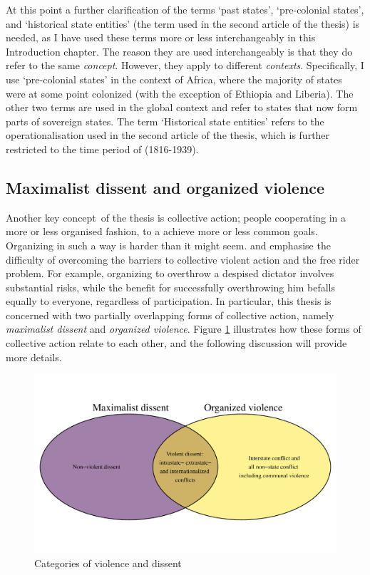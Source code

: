 At this point a further clarification of the terms `past states', `pre-colonial
states', and `historical state entities' (the term used in the second article of
the thesis) is needed, as I have used these terms more or less interchangeably
in this Introduction chapter. The reason they are used interchangeably is that
they do refer to the same \textit{concept}. However, they apply to different
\textit{contexts}. Specifically, I use `pre-colonial states' in the context of
Africa, where the majority of states were at some point colonized (with the
exception of Ethiopia and Liberia). The other two terms are used in the global
context and refer to states that now form parts of sovereign states. The term
`Historical state entities' refers to the operationalisation used in the second
article of the thesis, which is further restricted to the time period of
(1816-1939).

\subsection{Maximalist dissent and organized violence}
\label{Maximalist dissent and organized violence}

Another key concept of the thesis is collective action; people cooperating in a
more or less organised fashion, to a achieve more or less common goals.
Organizing in such a way is harder than it might seem.
\citet{OlsonMancur1965TLoC} and \citet{Tullock_1971} emphasise the difficulty of
overcoming the barriers to collective violent action and the free rider problem.
For example, organizing to overthrow a despised dictator involves substantial
risks, while the benefit for successfully overthrowing him befalls equally to
everyone, regardless of participation. In particular, this thesis is concerned
with two partially overlapping forms of collective action, namely
\textit{maximalist dissent} and \textit{organized violence}. Figure \ref{venn}
illustrates how these forms of collective action relate to each other, and the
following discussion will provide more details.

\begin{figure}[hpbt]
	\centering
	\includegraphics[width=\textwidth]{../R/Output/venn.pdf}
	\caption{Categories of violence and dissent}
	\label{venn}
\end{figure}

